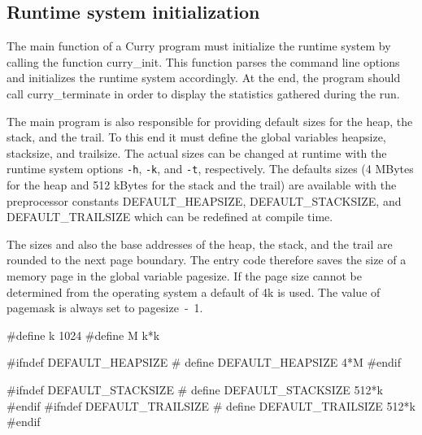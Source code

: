 %
%
\nwenddocs{}\nwdocspar
\subsection{Runtime system initialization}
The {\Tt{}main\nwendquote} function of a Curry program must initialize the runtime
system by calling the function {\Tt{}curry{\_}init\nwendquote}. This function parses
the command line options and initializes the runtime system
accordingly. At the end, the program should call {\Tt{}curry{\_}terminate\nwendquote}
in order to display the statistics gathered during the run.

The main program is also responsible for providing default sizes for
the heap, the stack, and the trail. To this end it must define the
global variables {\Tt{}heapsize\nwendquote}, {\Tt{}stacksize\nwendquote}, and {\Tt{}trailsize\nwendquote}. The
actual sizes can be changed at runtime with the runtime system options
\texttt{-h}, \texttt{-k}, and \texttt{-t}, respectively. The defaults
sizes (4 MBytes for the heap and 512 kBytes for the stack and the
trail) are available with the preprocessor constants
{\Tt{}DEFAULT{\_}HEAPSIZE\nwendquote}, {\Tt{}DEFAULT{\_}STACKSIZE\nwendquote}, and
{\Tt{}DEFAULT{\_}TRAILSIZE\nwendquote} which can be redefined at compile time.

The sizes and also the base addresses of the heap, the stack, and the
trail are rounded to the next page boundary. The entry code therefore
saves the size of a memory page in the global variable {\Tt{}pagesize\nwendquote}.
If the page size cannot be determined from the operating system a
default of 4k is used. The value of {\Tt{}pagemask\nwendquote} is always set to
{\Tt{}pagesize\ -\ 1\nwendquote}.

\nwenddocs{}\endmoddef\nwstartdeflinemarkup\nwenddeflinemarkup
#define k 1024
#define M k*k

#ifndef DEFAULT_HEAPSIZE
# define DEFAULT_HEAPSIZE 4*M
#endif

#ifndef DEFAULT_STACKSIZE
# define DEFAULT_STACKSIZE 512*k
#endif
#ifndef DEFAULT_TRAILSIZE
# define DEFAULT_TRAILSIZE 512*k
#endif

